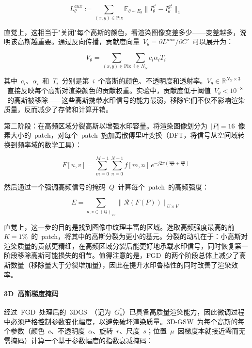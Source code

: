 \begin{equation}
  L^{aux}_\theta := \sum_{(x,y) \in \text{Pix}} \mathbb{E}_{\theta \sim E_\theta} \| I^{c'}_\theta - I^{gt}_\theta \|_1
\end{equation}

直觉上，这相当于"关闭"每个高斯的颜色，看渲染图像变差多少——变差越多，说明该高斯越重要。通过反向传播，贡献度向量~$V_\theta = \partial L^{aux} / \partial C'$~可以展开为：

\begin{equation}
  V_\theta = \sum_{(x,y) \in \text{Pix}} \sum_{i \in N_G} c_i \alpha_i T_i
\end{equation}

其中~$c_i$、$\alpha_i$~和~$T_i$~分别是第~$i$~个高斯的颜色、不透明度和透射率。$V_\theta \in \mathbb{R}^{N_G \times 3}$~直接反映每个高斯对渲染颜色的贡献权重。实验中，贡献度低于阈值~$V_\theta < 10^{-8}$~的高斯被移除——这些高斯携带水印信号的能力最弱，移除它们不仅不影响渲染质量，反而减少了存储和计算开销。

第二阶段：在高频区域分裂高斯以增强水印容量。将渲染图像划分为~$|P| = 16$~像素大小的~patch，对每个~patch~施加离散傅里叶变换（DFT，将信号从空间域转换到频率域的数学工具）：

\begin{equation}
  F[u,v] = \sum_{m=0}^{M-1} \sum_{n=0}^{N-1} f[m,n] \, e^{-j2\pi(\frac{um}{M} + \frac{vn}{N})}
\end{equation}

然后通过一个强调高频信号的掩码~$Q$~计算每个~patch~的高频强度：

\begin{equation}
  E = \sum_{u,v \in (Q)_{uv}} \|\mathcal{R}(F(P))\|_{U \times V}
\end{equation}

直觉上，这一步的目的是找到图像中纹理丰富的区域。选取高频强度最高的前~$K = 1\%$~的~patch，将其中的高斯分裂为更小的基元。分裂的动机在于：小高斯对渲染质量的贡献更精细，在高频区域分裂后能更好地承载水印信号，同时恢复第一阶段移除高斯可能损失的细节。值得注意的是，FGD~的两个阶段总体上减少了高斯数量（移除量大于分裂增加量），因此在提升水印鲁棒性的同时改善了渲染效率。

\paragraph{3D~高斯梯度掩码}
经过~FGD~处理后的~3DGS~（记为~$G^*_o$）已具备高质量渲染能力，因此微调过程中必须严格控制参数变化幅度，以避免破坏渲染质量。3D-GSW~为每个高斯的每个参数（颜色~$c$、不透明度~$\alpha$、旋转~$r$、尺度~$s$；位置~$\mu$~因梯度本就接近零而无需掩码）计算一个基于参数幅度的指数衰减掩码：


